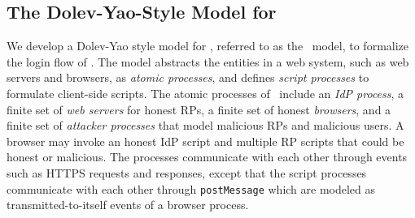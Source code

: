 


\subsection{The Dolev-Yao-Style Model for \usso}
\label{dy-model}

We develop a Dolev-Yao style model \cite{BrowserID, SPRESSO, FettKS16, FettKS17} for \usso, referred to as the \dyu\ model, to formalize the login flow of \usso.
The model abstracts the entities in a web system, such as web servers and browsers, as \emph{atomic processes}, %
and defines \emph{script processes} to formulate client-side scripts.
The atomic processes of \usso\ include an {\em IdP process}, a finite set of {\em web servers} for honest RPs, a finite set of honest {\em browsers}, and a finite set of {\em attacker processes} that model malicious RPs and malicious users.
A browser may invoke an honest IdP script and multiple RP scripts that could be honest or malicious.
The processes communicate with each other through events such as HTTPS requests and responses,
except that the script processes communicate with each other through \verb+postMessage+ which are modeled as transmitted-to-itself events of a browser process.

